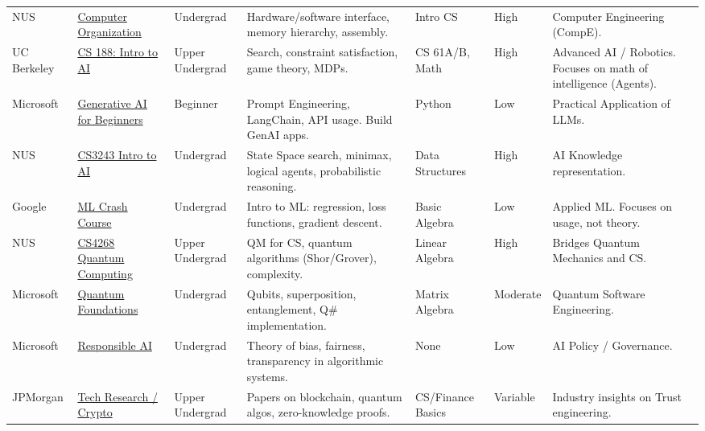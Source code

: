 \documentclass[10pt, a4paper, landscape]{article}
\begin{document}
\begin{longtable}{L{2cm} L{3.5cm} L{1.8cm} L{6cm} L{3.5cm} L{2cm} L{5cm}}
    \addlinespace
    NUS & \href{https://nusmods.com/courses/CS2100/computer-organisation}{Computer Organization} & Undergrad & Hardware/software interface, memory hierarchy, assembly. & Intro CS & High & Computer Engineering (CompE). \\
    \addlinespace
    UC Berkeley & \href{https://inst.eecs.berkeley.edu/~cs188/}{CS 188: Intro to AI} & Upper Undergrad & Search, constraint satisfaction, game theory, MDPs. & CS 61A/B, Math & High & Advanced AI / Robotics. Focuses on math of intelligence (Agents). \\
    \addlinespace
    Microsoft & \href{https://github.com/microsoft/generative-ai-for-beginners}{Generative AI for Beginners} & Beginner & Prompt Engineering, LangChain, API usage. Build GenAI apps. & Python & Low & Practical Application of LLMs. \\
    \addlinespace
    NUS & \href{https://nusmods.com/courses/CS3243/introduction-to-artificial-intelligence}{CS3243 Intro to AI} & Undergrad & State Space search, minimax, logical agents, probabilistic reasoning. & Data Structures & High & AI Knowledge representation. \\
    \addlinespace
    Google & \href{https://developers.google.com/machine-learning/crash-course}{ML Crash Course} & Undergrad & Intro to ML: regression, loss functions, gradient descent. & Basic Algebra & Low & Applied ML. Focuses on usage, not theory. \\
    \addlinespace
    \addlinespace
    NUS & \href{https://nusmods.com/courses/CS4268/quantum-computing}{CS4268 Quantum Computing} & Upper Undergrad & QM for CS, quantum algorithms (Shor/Grover), complexity. & Linear Algebra & High & Bridges Quantum Mechanics and CS. \\
    \addlinespace
    Microsoft & \href{https://learn.microsoft.com/en-us/training/paths/quantum-computing-fundamentals/}{Quantum Foundations} & Undergrad & Qubits, superposition, entanglement, Q\# implementation. & Matrix Algebra & Moderate & Quantum Software Engineering. \\
    \addlinespace
    Microsoft & \href{https://learn.microsoft.com/en-us/ai/responsible-ai-dashboard}{Responsible AI} & Undergrad & Theory of bias, fairness, transparency in algorithmic systems. & None & Low & AI Policy / Governance. \\
    \addlinespace
    JPMorgan & \href{https://www.jpmorgan.com/technology/artificial-intelligence}{Tech Research / Crypto} & Upper Undergrad & Papers on blockchain, quantum algos, zero-knowledge proofs. & CS/Finance Basics & Variable & Industry insights on Trust engineering. \\

\end{longtable}
\end{document}
